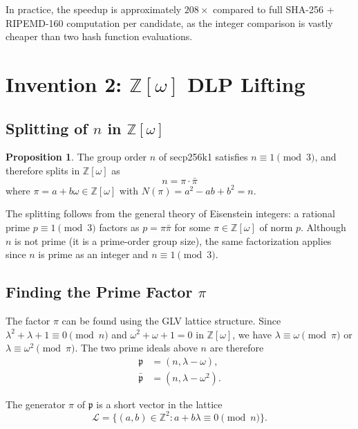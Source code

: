 \documentclass[11pt,a4paper]{article}
\theoremstyle{definition}
\newtheorem{proposition}[theorem]{Proposition}
\newcommand{\Zomega}{\mathbb{Z}[\omega]}
\begin{document}
In practice, the speedup is approximately $208\times$ compared to full SHA-256 + RIPEMD-160 computation per candidate, as the integer comparison is vastly cheaper than two hash function evaluations.


\section{Invention 2: $\Zomega$ DLP Lifting}\label{sec:zomega}

\subsection{Splitting of $n$ in $\Zomega$}

\begin{proposition}
The group order $n$ of secp256k1 satisfies $n \equiv 1 \pmod{3}$, and therefore splits in $\Zomega$ as
\begin{equation}\label{eq:n-split}
n = \pi \cdot \bar{\pi}
\end{equation}
where $\pi = a + b\omega \in \Zomega$ with $N(\pi) = a^2 - ab + b^2 = n$.
\end{proposition}

The splitting follows from the general theory of Eisenstein integers: a rational prime $p \equiv 1 \pmod{3}$ factors as $p = \pi\bar{\pi}$ for some $\pi \in \Zomega$ of norm $p$. Although $n$ is not prime (it is a prime-order group size), the same factorization applies since $n$ is prime as an integer and $n \equiv 1 \pmod{3}$.

\subsection{Finding the Prime Factor $\pi$}

The factor $\pi$ can be found using the GLV lattice structure. Since $\lambda^2 + \lambda + 1 \equiv 0 \pmod{n}$ and $\omega^2 + \omega + 1 = 0$ in $\Zomega$, we have $\lambda \equiv \omega \pmod{\pi}$ or $\lambda \equiv \omega^2 \pmod{\pi}$. The two prime ideals above $n$ are therefore
\begin{align}
\mathfrak{p} &= (n, \lambda - \omega), \\
\bar{\mathfrak{p}} &= (n, \lambda - \omega^2).
\end{align}

The generator $\pi$ of $\mathfrak{p}$ is a short vector in the lattice
\begin{equation}
\mathcal{L} = \{(a, b) \in \mathbb{Z}^2 : a + b\lambda \equiv 0 \pmod{n}\}.
\end{equation}
\end{document}
